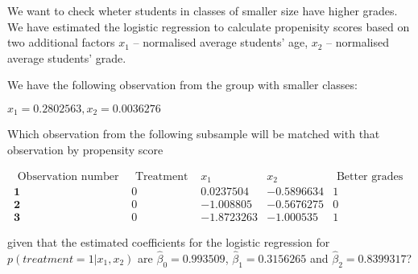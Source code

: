 
\begin{question}
We want to check wheter students in classes of smaller size have higher grades. We have estimated the logistic regression to calculate propenisity scores based on two additional factors \(x_1\) -- normalised average students' age, \(x_2\) -- normalised average students' grade.

We have the following observation from the group with smaller classes:

\(x_1=0.2802563, x_2=0.0036276\)

Which observation from the following subsample will be matched with that observation by propensity score

\[
\begin{array}{rrrrr} 
 \text { Observation number }&  \text { Treatment } &  x_1  &  x_2  & \text { Better grades } \\
\hline 
 \mathbf{1} & 0 & 0.0237504 & -0.5896634 & 1 \\
 \mathbf{2} & 0 & -1.008805 & -0.5676275  & 0 \\
 \mathbf{3} & 0 &  -1.8723263  & -1.000535   & 1
\end{array}
\]

given that the estimated coefficients for the logistic regression for \(p(treatment=1|x_1,x_2)\) are \(\hat{\beta}_0 = 0.993509\), \(\hat{\beta}_1 = 0.3156265\) and \(\hat{\beta}_2 = 0.8399317\)?
\end{question}


